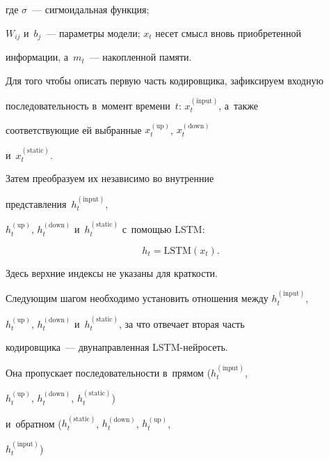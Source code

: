   

  \vspace*{-2pt}

  

  \noindent

где $\sigma$~--- сигмоидальная функция; %

$W_{ij}$ и~$b_j$~--- па\-ра\-мет\-ры модели; $x_t$ несет смысл вновь приобретенной 

информации, а~$m_t$~--- накопленной памяти.





Для того чтобы описать первую часть кодировщика, зафиксируем вход\-ную 

последовательность в~момент времени~$t$: $x^{(\mathrm{input})}_{t}$, а~также 

соответствующие ей выбранные $x^{(\mathrm{up})}_t$, $x^{(\mathrm{down})}_t$

и~$x^{(\mathrm{static})}_t$. 

Затем преобразуем их независимо во внут\-рен\-ние 

пред\-став\-ле\-ния~$h^{(\mathrm{input})}_{t}$, 

$h^{(\mathrm{up})}_t$, $h^{(\mathrm{down})}_t$ и~$h^{(\mathrm{static})}_t$ с~по\-мощью LSTM:

\begin{equation*}

    h_t = \mathrm{LSTM}\left(x_t\right).

\end{equation*}

Здесь верхние индексы не указаны для краткости.



Следующим шагом необходимо установить отношения между $h^{(\mathrm{input})}_{t}$, 

$h^{(\mathrm{up})}_t$, $h^{(\mathrm{down})}_t$ и~$h^{(\mathrm{static})}_t$, за что отвечает вторая часть 

кодировщика~--- дву\-на\-прав\-лен\-ная LSTM-ней\-ро\-сеть. 

Она пропускает последовательности в~прямом ($h^{(\mathrm{input})}_{t}$, 

$h^{(\mathrm{up})}_t$, $h^{(\mathrm{down})}_t$, $h^{(\mathrm{static})}_t$) 

и~обратном ($h^{(\mathrm{static})}_{t}$, $h^{(\mathrm{down})}_t$, $h^{(\mathrm{up})}_t$, 

$h^{(\mathrm{input})}_t$) 

